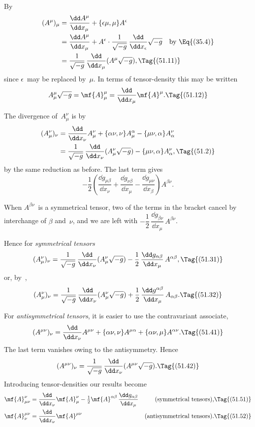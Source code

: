 \documentclass[12pt]{book}
\begin{document}
By 
\begin{align*}
  (A^{\mu})_{\mu}
  &= \frac{\dd A^{\mu}}{\dd x_{\mu}} + \{\epsilon\mu, \mu\} A^{\epsilon} \\
  &= \frac{\dd A^{\mu}}{\dd x_{\mu}}
  + A^{\epsilon} \cdot \frac{1}{\sqrt{-g}}\, \frac{\dd}{\dd x_{\epsilon}} \sqrt{-g}
  \quad\text{by~\Eq{(35.4)}} \\
  &= \frac{1}{\sqrt{-g}}\, \frac{\dd}{\dd x_{\mu}} (A^{\mu} \sqrt{-g}),
  \Tag{(51.11)}
\end{align*}
since $\epsilon$~may be replaced by~$\mu$. In terms of tensor-density this may be written
\[
A_{\mu}^{\mu} \sqrt{-g}
= \mf{A}_{\mu}^{\mu}
= \frac{\dd}{\dd x_{\mu}} \mf{A}^{\mu}.
\Tag{(51.12)}
\]

The divergence of~$A_{\mu}^{\nu}$ is by~
\begin{align*}
  (A_{\mu}^{\nu})_{\nu}
  &= \frac{\dd}{\dd x_{\nu}} A_{\mu}^{\nu} + \{\alpha\nu,\nu\} A_{\mu}^{\alpha} - \{\mu\nu, \alpha\} A_{\alpha}^{\nu} \\
  &= \frac{1}{\sqrt{-g}}\, \frac{\dd}{\dd x_{\nu}} (A_{\mu}^{\nu} \sqrt{-g}) - \{\mu\nu, \alpha\} A_{\alpha}^{\nu},
  \Tag{(51.2)}
\end{align*}
by the same reduction as before. The last term gives
\[
-\frac{1}{2} \left(\frac{\dd g_{\mu\beta}}{\dd x_{\nu}}
+ \frac{\dd g_{\nu\beta}}{\dd x_{\mu}}
- \frac{\dd g_{\mu\nu}}{\dd x_{\beta}}\right) A^{\beta\nu}.
\]

When $A^{\beta\nu}$~is a symmetrical tensor, two of the terms in the bracket cancel
by interchange of $\beta$ and~$\nu$, and we are left with $-\dfrac{1}{2}\, \dfrac{\dd g_{\beta\nu}}{\dd x_{\mu}}\, A^{\beta\nu}$.

Hence for \emph{symmetrical tensors}
\[
(A_{\mu}^{\nu})_{\nu}
= \frac{1}{\sqrt{-g}}\, \frac{\dd}{\dd x_{\nu}} (A_{\mu}^{\nu} \sqrt{-g})
- \frac{1}{2}\, \frac{\dd g_{\alpha\beta}}{\dd x_{\mu}}\, A^{\alpha\beta},
\Tag{(51.31)}
\]
or, by~,
\[
(A_{\mu}^{\nu})_{\nu}
= \frac{1}{\sqrt{-g}}\, \frac{\dd}{\dd x_{\nu}} (A_{\mu}^{\nu} \sqrt{-g})
+ \frac{1}{2}\, \frac{\dd g^{\alpha\beta}}{\dd x_{\mu}}\, A_{\alpha\beta}.
\Tag{(51.32)}
\]

For \emph{antisymmetrical tensors}, it is easier to use the contravariant associate,
\[
(A^{\mu\nu})_{\nu}
= \frac{\dd}{\dd x_{\nu}} A^{\mu\nu} + \{\alpha\nu,\nu\} A^{\mu\alpha} + \{\alpha\nu, \mu\} A^{\alpha\nu}.
\Tag{(51.41)}
\]
The last term vanishes owing to the antisymmetry. Hence
\[
(A^{\mu\nu})_{\nu}
= \frac{1}{\sqrt{-g}}\, \frac{\dd}{\dd x_{\nu}} (A^{\mu\nu} \sqrt{-g}).
\Tag{(51.42)}
\]
Introducing tensor-densities our results become
\begin{align*}
  \mf{A}_{\mu\nu}^{\nu}
  &= \frac{\dd}{\dd x_{\nu}} \mf{A}_{\mu}^{\nu}
  - \tfrac{1}{2} \mf{A}^{\alpha\beta}\, \frac{\dd g_{\alpha\beta}}{\dd x_{\mu}}
  & \text{(symmetrical tensors),}&
  \Tag{(51.51)} \\
  \mf{A}_{\nu}^{\mu\nu}
  &= \frac{\dd}{\dd x_{\nu}} \mf{A}^{\mu\nu}
  & \text{(antisymmetrical tensors).} &
  \Tag{(51.52)}
\end{align*}
\end{document}
